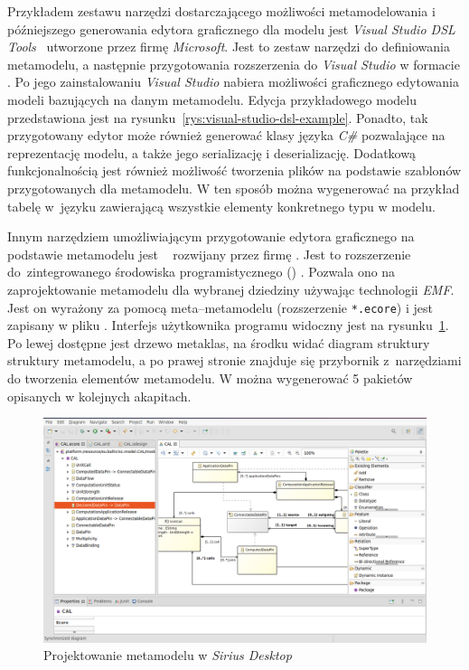 Przykładem zestawu narzędzi dostarczającego możliwości metamodelowania i
późniejszego generowania edytora graficznego dla modelu jest \emph{Visual
	Studio DSL Tools}~\cite{visual-studio-dsl-introduction} utworzone przez
firmę \emph{Microsoft}. Jest to zestaw
narzędzi do definiowania metamodelu, a następnie przygotowania rozszerzenia do
\emph{Visual Studio} w formacie . Po jego zainstalowaniu
\emph{Visual Studio} nabiera możliwości graficznego edytowania modeli
bazujących na danym metamodelu. Edycja przykładowego modelu przedstawiona jest
na rysunku~\ref{rys:visual-studio-dsl-example}. Ponadto, tak przygotowany
edytor
może również generować klasy języka \emph{C\#} pozwalające na reprezentację
modelu, a
także jego serializację i deserializację. Dodatkową funkcjonalnością jest
również możliwość tworzenia plików na podstawie szablonów przygotowanych dla
metamodelu. W ten sposób można wygenerować na przykład tabelę w~języku
 zawierającą wszystkie elementy konkretnego typu w modelu.

Innym narzędziem umożliwiającym przygotowanie edytora graficznego na podstawie
metamodelu jest \SiriusDesktop{}~\cite{sirius-desktop-homepage} rozwijany
przez firmę \Eclipse{}. Jest to rozszerzenie do~zintegrowanego środowiska
programistycznego () \Eclipse{}. Pozwala ono na zaprojektowanie
metamodelu dla wybranej dziedziny używając technologii \emph{\acrfull{EMF}}.
Jest on wyrażony za pomocą
meta--metamodelu  %
\Ecore{} (rozszerzenie \texttt{*.ecore}) i jest
zapisany w pliku . Interfejs użytkownika programu \SiriusDesktop{}
widoczny jest na rysunku~\ref{rys:sirius-desktop-example-metamodel}. Po lewej
dostępne jest drzewo metaklas, na środku widać diagram struktury struktury
metamodelu, a po prawej stronie znajduje się przybornik z~narzędziami do
tworzenia elementów metamodelu. W \SiriusDesktop{}
można wygenerować 5 pakietów opisanych w kolejnych akapitach.

\begin{figure}[!ht]
	\centering

	\includegraphics[width=0.95\linewidth]{./images/sirius-desktop-metamodel.png}
	\caption{Projektowanie metamodelu w \emph{Sirius
			Desktop}}\label{rys:sirius-desktop-example-metamodel}
\end{figure}

